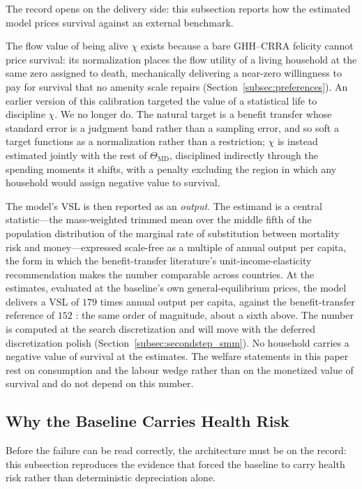 \documentclass[12pt,a4paper]{article}
\begin{document}
The record opens on the delivery side: this subsection reports how the estimated model prices survival against an external benchmark.

The flow value of being alive $\chi$ exists because a bare GHH--CRRA felicity cannot price survival: its normalization places the flow utility of a living household at the same zero assigned to death, mechanically delivering a near-zero willingness to pay for survival that no amenity scale repairs (Section~\ref{subsec:preferences}). An earlier version of this calibration targeted the value of a statistical life to discipline $\chi$. We no longer do. The natural target is a benefit transfer whose standard error is a judgment band rather than a sampling error, and so soft a target functions as a normalization rather than a restriction; $\chi$ is instead estimated jointly with the rest of $\Theta_{\mathrm{MD}}$, disciplined indirectly through the spending moments it shifts, with a penalty excluding the region in which any household would assign negative value to survival.

The model's VSL is then reported as an \emph{output}. The estimand is a central statistic---the mass-weighted trimmed mean over the middle fifth of the population distribution of the marginal rate of substitution between mortality risk and money---expressed scale-free as a multiple of annual output per capita, the form in which the benefit-transfer literature's unit-income-elasticity recommendation makes the number comparable across countries. At the estimates, evaluated at the baseline's own general-equilibrium prices, the model delivers a VSL of $179$ times annual output per capita, against the benefit-transfer reference of $152$ \citep{viscusi_masterman_2017}: the same order of magnitude, about a sixth above. The number is computed at the search discretization and will move with the deferred discretization polish (Section~\ref{subsec:secondstep_smm}). No household carries a negative value of survival at the estimates. The welfare statements in this paper rest on consumption and the labour wedge rather than on the monetized value of survival and do not depend on this number.

\subsection{Why the Baseline Carries Health Risk}
\label{subsec:health_block_evidence}

Before the failure can be read correctly, the architecture must be on the record: this subsection reproduces the evidence that forced the baseline to carry health risk rather than deterministic depreciation alone.
\end{document}
